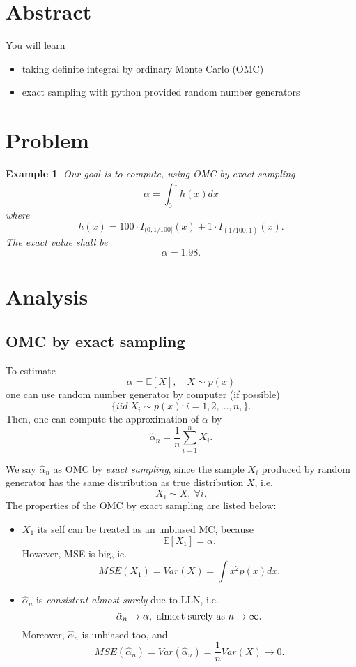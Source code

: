 \documentclass{article}
\newtheorem{example}{Example}
\begin{document}
\section{Abstract}
You will learn
\begin{itemize}
 \item taking definite integral by ordinary Monte Carlo (OMC)
 \item exact sampling with python provided random number generators
\end{itemize}

\section{Problem}

\begin{example}\label{ex:integral}
Our goal is to compute, using OMC by exact sampling
$$\alpha = \int_0^1 h(x) dx$$
where
$$h(x) = 100 \cdot I_{(0, 1/100]}(x) + 1\cdot I_{(1/100, 1)} (x).$$
The exact value shall be 
$$\alpha = 1.98.$$
\end{example}

\section{Analysis}

\subsection{OMC by exact sampling}
To estimate 
$$\alpha = \mathbb E[X], \quad X \sim p(x)$$
one can use random number generator by computer (if possible)
$$\{iid \ X_i \sim p(x): i = 1, 2, \ldots, n, \} .$$
Then, one can compute the approximation of $\alpha$ by
$$\hat \alpha_n = \frac 1 n \sum_{i=1}^n X_i.$$

We say $\hat \alpha_n$ as OMC by {\it exact sampling}, since the sample $X_i$
produced by random generator has the same distribution as true distribution $X$, 
i.e. 
$$X_i \sim X, \ \forall i.$$
The properties of the OMC by exact sampling are listed below:
\begin{itemize}
 \item $X_1$ its self can be treated as an unbiased MC, because
 $$\mathbb E [X_1] = \alpha.$$
 However, MSE is big, ie.
 $$MSE(X_1) = Var(X) = \int x^2 p(x) dx.$$
 \item $\hat \alpha_n$ is {\it consistent almost surely} due to LLN, i.e.
 $$\hat \alpha_n \to \alpha, \hbox{ almost surely as } n\to \infty.$$
 Moreover, $\hat \alpha_n$ is unbiased too, and
 $$MSE(\hat \alpha_n) = Var(\hat \alpha_n) = \frac 1 n Var(X) \to 0.$$
\end{itemize}
\end{document}
